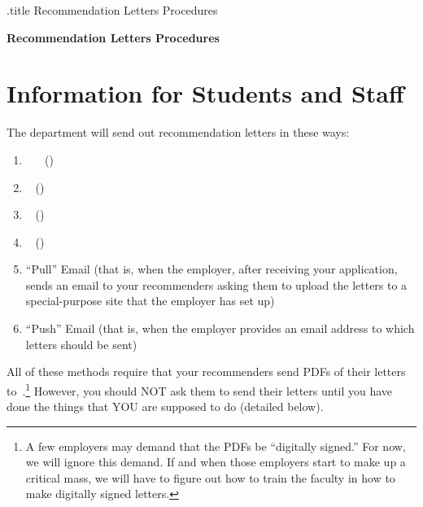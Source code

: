 \documentclass{\econtex}
\begin{document}
\renewcommand{\thepage}{} %


\begin{verbatimwrite}{\jobname.title}
  Recommendation Letters Procedures
\end{verbatimwrite}
\centerline{\textbf{{\Large Recommendation Letters Procedures}}}\medskip\medskip


\section{Information for Students and Staff}\hypertarget{students-and-staff}{}

The department will send out recommendation letters in these ways:
\begin{enumerate}
\item {\EJM}~ ~ (\EJMLink)
\item \AJO ~ (\AJOLink)
\item \AEA ~ (\AEALink)
\item \Interfolio ~ (\InterfolioLink)
\item ``Pull'' Email (that is, when the employer, after receiving your application, sends an email to your recommenders asking them to upload the letters to a special-purpose site that the employer has set up)
\item ``Push'' Email (that is, when the employer provides an email address to which letters should be sent)
\end{enumerate}

All of these methods require that your recommenders send PDFs of their letters 
to~\jmstaffemail.\footnote{A few employers may demand that the PDFs be ``digitally signed.''  For now, we will ignore this demand.  If and when those employers start to make up a critical mass, we will have to figure out how to train the faculty in how to make digitally signed letters.}  However, you should NOT ask them to send their letters until you have done the things that YOU are supposed to do (detailed below).
\end{document}
